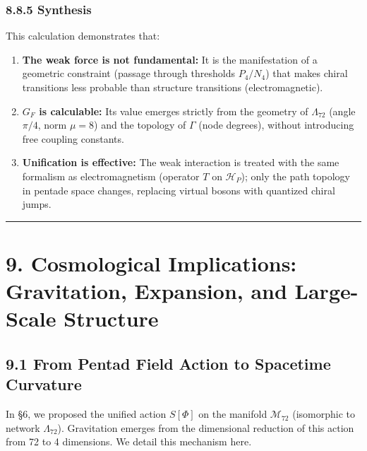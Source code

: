 \documentclass[11pt]{article}
\providecommand{\tightlist}{\setlength{\itemsep}{2pt}\setlength{\parskip}{6pt}}
\let\oldmathcal\mathcal
\renewcommand{\mathcal}[1]{\oldmathcal{#1}}
\providecommand{\tightlist}{%
  \setlength{\itemsep}{2pt}\setlength{\parskip}{6pt}
}
\begin{document}
\hypertarget{synthesis}{%
\subsubsection{8.8.5 Synthesis}\label{synthesis}}

This calculation demonstrates that:

\begin{enumerate}
\def\labelenumi{\arabic{enumi}.}
\tightlist
\item
  \textbf{The weak force is not fundamental:} It is the manifestation of
  a geometric constraint (passage through thresholds \(P_4/N_4\)) that
  makes chiral transitions less probable than structure transitions
  (electromagnetic).
\item
  \textbf{\(G_F\) is calculable:} Its value emerges strictly from the
  geometry of \(\Lambda_{72}\) (angle \(\pi/4\), norm \(\mu=8\)) and the
  topology of \(\Gamma\) (node degrees), without introducing free
  coupling constants.
\item
  \textbf{Unification is effective:} The weak interaction is treated
  with the same formalism as electromagnetism (operator \(T\) on
  \(\mathcal{H}_P\)); only the path topology in pentade space changes,
  replacing virtual bosons with quantized chiral jumps.
\end{enumerate}

\begin{center}\rule{0.5\linewidth}{0.5pt}\end{center}

\hypertarget{cosmological-implications-gravitation-expansion-and-large-scale-structure}{%
\section{9. Cosmological Implications: Gravitation, Expansion, and
Large-Scale
Structure}\label{cosmological-implications-gravitation-expansion-and-large-scale-structure}}

\hypertarget{from-pentad-field-action-to-spacetime-curvature}{%
\subsection{9.1 From Pentad Field Action to Spacetime
Curvature}\label{from-pentad-field-action-to-spacetime-curvature}}

In §6, we proposed the unified action \(S[\Phi]\) on the manifold
\(\mathcal{M}_{72}\) (isomorphic to network \(\Lambda_{72}\)).
Gravitation emerges from the dimensional reduction of this action from
72 to 4 dimensions. We detail this mechanism here.
\end{document}
